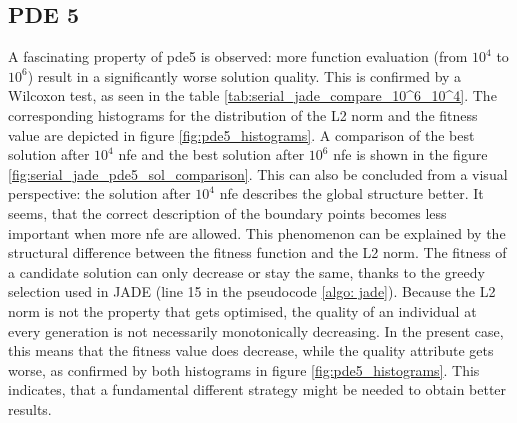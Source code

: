 \documentclass[./\jobname.tex]{subfiles}
\begin{document}
\subsection{PDE 5}

A fascinating property of \gls{pde}5 is observed: more function evaluation (from $10^4$ to $10^6$) result in a significantly worse solution quality. This is confirmed by a Wilcoxon test, as seen in the table \ref{tab:serial_jade_compare_10^6_10^4}. The corresponding histograms for the distribution of the L2 norm and the fitness value are depicted in figure \ref{fig:pde5_histograms}. 
A comparison of the best solution after $10^4$ \gls{nfe} and the best solution after $10^6$ \gls{nfe} is shown in the figure \ref{fig:serial_jade_pde5_sol_comparison}. This can also be concluded from a visual perspective: the solution after $10^4$ \gls{nfe} describes the global structure better. It seems, that the correct description of the boundary points becomes less important when more \gls{nfe} are allowed. This phenomenon can be explained by the structural difference between the fitness function and the L2 norm. The fitness of a candidate solution can only decrease or stay the same, thanks to the greedy selection used in JADE (line 15 in the pseudocode \ref{algo: jade}). Because the L2 norm is not the property that gets optimised, the quality of an individual at every generation is not necessarily monotonically decreasing. In the present case, this means that the fitness value does decrease, while the quality attribute gets worse, as confirmed by both histograms in figure \ref{fig:pde5_histograms}. 
This indicates, that a fundamental different strategy might be needed to obtain better results. 
\end{document}
